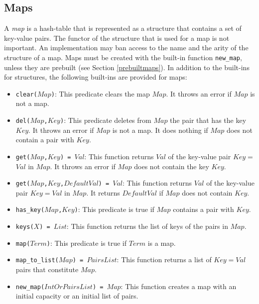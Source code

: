 \subsection{Maps}
A \emph{map} is a hash-table that is represented as a structure that contains a set of key-value pairs. The functor of the structure that is used for a map is not important.  An implementation may ban access to the name and the arity of the structure of a map. Maps must be created with the built-in function \texttt{new\_map}, unless they are prebuilt (see Section \ref{prebuiltmaps}). In addition to the built-ins for structures, the following built-ins are provided for maps:
\begin{itemize}
\item \texttt{clear($Map$)}: This predicate clears the map $Map$. It throws an error if $Map$ is not a map.
\item \texttt{del($Map$,$Key$)}: This predicate deletes from $Map$ the pair that has the key $Key$. It throws an error if $Map$ is not a map. It does nothing if $Map$ does not contain a pair with $Key$.
\item \texttt{get($Map$,$Key$) = $Val$}: This function returns \texttt{$Val$} of the key-value pair \texttt{$Key$$=$$Val$} in \texttt{$Map$}. It throws an error if $Map$ does not contain the key $Key$.
\item \texttt{get($Map$,$Key$,$DefaultVal$) = $Val$}: This function returns \texttt{$Val$} of the key-value pair \texttt{$Key$$=$$Val$} in \texttt{$Map$}. It returns $DefaultVal$ if $Map$ does not contain $Key$.
\item \texttt{has\_key($Map$,$Key$)}: This predicate is true if $Map$ contains a pair with $Key$. 
\item \texttt{keys($X$) = $List$}: This function returns the list of keys of the pairs in $Map$.
\item \texttt{map($Term$)}: This predicate is true if $Term$ is a map. 
\item \texttt{map\_to\_list($Map$) = $PairsList$}: This function returns a list of \texttt{$Key$$=$$Val$} pairs that constitute $Map$. 
\item \texttt{new\_map($IntOrPairsList$) = $Map$}: This function creates a map with an initial capacity or an initial list of pairs.

\end{itemize}
